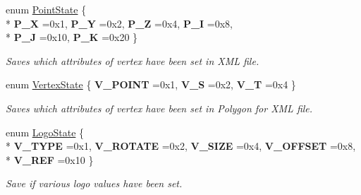 \begin{DoxyCompactItemize}
\item 
enum \hyperlink{structMeshXML_a515dcdf8e86fe7856c7be23613eb5936}{Point\+State} \{ \\*
{\bfseries P\+\_\+X} =0x1, 
{\bfseries P\+\_\+Y} =0x2, 
{\bfseries P\+\_\+Z} =0x4, 
{\bfseries P\+\_\+I} =0x8, 
\\*
{\bfseries P\+\_\+J} =0x10, 
{\bfseries P\+\_\+K} =0x20
 \}\hypertarget{structMeshXML_a515dcdf8e86fe7856c7be23613eb5936}{}\label{structMeshXML_a515dcdf8e86fe7856c7be23613eb5936}
\begin{DoxyCompactList}\small\item\em Saves which attributes of vertex have been set in X\+ML file. \end{DoxyCompactList}
\item 
enum \hyperlink{structMeshXML_adc781fb533ba8333c6c3cf5b75cfa7e7}{Vertex\+State} \{ {\bfseries V\+\_\+\+P\+O\+I\+NT} =0x1, 
{\bfseries V\+\_\+S} =0x2, 
{\bfseries V\+\_\+T} =0x4
 \}\hypertarget{structMeshXML_adc781fb533ba8333c6c3cf5b75cfa7e7}{}\label{structMeshXML_adc781fb533ba8333c6c3cf5b75cfa7e7}
\begin{DoxyCompactList}\small\item\em Saves which attributes of vertex have been set in Polygon for X\+ML file. \end{DoxyCompactList}
\item 
enum \hyperlink{structMeshXML_a6fb88085bb22dfee29cd432287c0df54}{Logo\+State} \{ \\*
{\bfseries V\+\_\+\+T\+Y\+PE} =0x1, 
{\bfseries V\+\_\+\+R\+O\+T\+A\+TE} =0x2, 
{\bfseries V\+\_\+\+S\+I\+ZE} =0x4, 
{\bfseries V\+\_\+\+O\+F\+F\+S\+ET} =0x8, 
\\*
{\bfseries V\+\_\+\+R\+EF} =0x10
 \}\hypertarget{structMeshXML_a6fb88085bb22dfee29cd432287c0df54}{}\label{structMeshXML_a6fb88085bb22dfee29cd432287c0df54}
\begin{DoxyCompactList}\small\item\em Save if various logo values have been set. \end{DoxyCompactList}
\end{DoxyCompactItemize}
